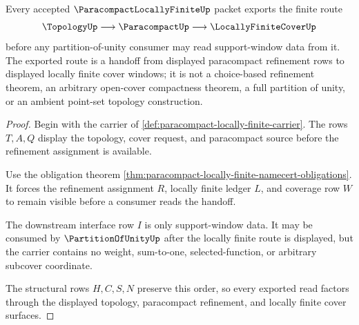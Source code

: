 \begin{theorem}
\label{thm:paracompact-locally-finite-handoff-route}
Every accepted $\ParacompactLocallyFiniteUp$ packet exports the finite route
$$
\TopologyUp \longrightarrow \ParacompactUp \longrightarrow \LocallyFiniteCoverUp
$$
before any partition-of-unity consumer may read support-window data from it. The exported route is a handoff from displayed paracompact refinement rows to displayed locally finite cover windows; it is not a choice-based refinement theorem, an arbitrary open-cover compactness theorem, a full partition of unity, or an ambient point-set topology construction.
\end{theorem}
\begin{proof}
Begin with the carrier of \autoref{def:paracompact-locally-finite-carrier}. The rows $T,A,Q$ display the topology, cover request, and paracompact source before the refinement assignment is available.

Use the obligation theorem \autoref{thm:paracompact-locally-finite-namecert-obligations}. It forces the refinement assignment $R$, locally finite ledger $L$, and coverage row $W$ to remain visible before a consumer reads the handoff.

The downstream interface row $I$ is only support-window data. It may be consumed by $\PartitionOfUnityUp$ after the locally finite route is displayed, but the carrier contains no weight, sum-to-one, selected-function, or arbitrary subcover coordinate.

The structural rows $H,C,S,N$ preserve this order, so every exported read factors through the displayed topology, paracompact refinement, and locally finite cover surfaces.
\end{proof}


